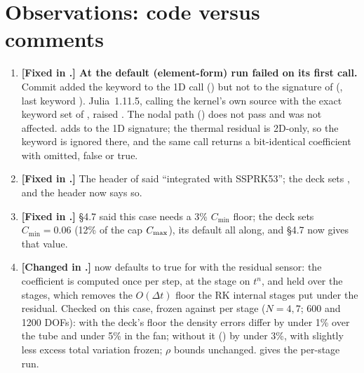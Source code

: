 \documentclass[10pt]{article}
\begin{document}
\section{Observations: code versus comments}
\label{sec:obs}
\begin{enumerate}[leftmargin=*]
\item \textbf{[Fixed in .] At \commit{} the default (element-form) run failed on its first
\dsgs{} call.} Commit  added the keyword  to the 1D call
() but not to the signature of  (, last keyword ). Julia~1.11.5, calling the
kernel's own source with the exact keyword set of , raised
. The nodal path
() does not pass  and was not affected.  adds
 to the 1D signature; the thermal residual is 2D-only, so the keyword is ignored
there, and the same call returns a bit-identical coefficient with  omitted, false or true.
\item \textbf{[Fixed in .]} The header of  said ``integrated with SSPRK53''; the deck
sets , and the header now says so.
\item \textbf{[Fixed in .]}  \S4.7 said this case needs a 3\% $C_{\min}$ floor; the deck sets
$C_{\min}=0.06$ (12\% of the cap $C_{\max}$), its default all along, and \S4.7 now gives that value.
\item \textbf{[Changed in .]}  now defaults to true for 
with the residual sensor: the coefficient is computed once per step, at the stage on $t^n$, and held over the stages,
which removes the $O(\Delta t)$ floor the RK internal stages put under the residual. Checked on this case, frozen
against per stage ($N=4,7$; 600 and 1200 DOFs): with the deck's floor the density errors differ by under 1\% over
the tube and under 5\% in the fan; without it () by under 3\%, with slightly less excess
total variation frozen; $\rho$ bounds unchanged.  gives the per-stage run.
\end{enumerate}


\end{document}
